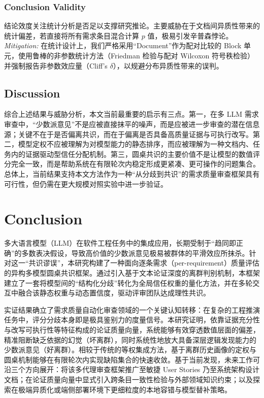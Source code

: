 \documentclass[a4paper,11pt]{ctexart}
\begin{document}
\subsubsection{Conclusion Validity}
结论效度关注统计分析是否足以支撑研究推论。主要威胁在于文档间异质性带来的统计偏差，若直接将所有需求条目混合计算 $p$ 值，极易引发辛普森悖论。\textit{Mitigation:} 在统计设计上，我们严格采用“Document”作为配对比较的 Block 单元，使用鲁棒的非参数统计方法（Friedman 检验与配对 Wilcoxon 符号秩检验）并强制报告非参数效应量（Cliff's $\delta$），以规避分布异质性带来的误判。

\subsection{Discussion}

综合上述结果与威胁分析，本文当前最重要的启示有三点。第一，在多 LLM 需求审查中，“少数派意见”不是应被直接抹平的噪声，而是应被进一步审查的潜在信息源；关键不在于是否偏离共识，而在于偏离是否具备高质量证据与可执行改写。第二，模型定权不应被理解为对模型能力的静态排序，而应被理解为一种文档内、任务内的证据驱动型信任分配机制。第三，圆桌共识的主要价值不是让模型的数值评分完全一致，而是帮助系统在有限轮次内稳定形成更紧凑、更可操作的问题集合。总体上，当前结果支持本文方法作为一种“从分歧到共识”的需求质量审查框架具有可行性，但仍需在更大规模对照实验中进一步验证。

\section{Conclusion}
\label{sec:conclusion}
多大语言模型（LLM）在软件工程任务中的集成应用，长期受制于“趋同即正确”的多数表决假设，导致高价值的少数派意见极易被群体的平滑效应所抹杀。针对这一“共识谬误”，本研究构建了一种面向逐条需求（per-requirement）质量评估的异构多模型圆桌共识框架。通过引入基于文本论证深度的离群判别机制，本框架建立了一套将模型间的“结构化分歧”转化为全局信任权重的量化方法，并在多轮交互中融合该静态权重与动态置信度，驱动评审团队达成理性共识。

实证结果确立了需求质量自动化审查领域的一个关键认知转移：在复杂的工程推演任务中，评分分歧本身即是极具鉴别力的度量信号。本研究证明，依靠证据充分性与改写可执行性等特征构成的论证质量向量，系统能够有效穿透数值层面的偏差，精准阻断缺乏依据的幻觉（坏离群），同时系统性地放大具备深层逻辑发现能力的少数派意见（好离群）。相较于传统的等权集成方法，基于离群历史画像的定权与圆桌机制能够在有限轮次内实现缺陷集合的快速收敛。基于当前发现，未来工作可沿三个方向展开：将该多代理审查框架推广至敏捷 User Stories 乃至系统架构设计文档；在论证质量向量中显式引入跨条目一致性检验与外部领域知识约束；以及探索在极端异质化或端侧部署环境下更细粒度的本地容错与模型替补策略。
\end{document}
